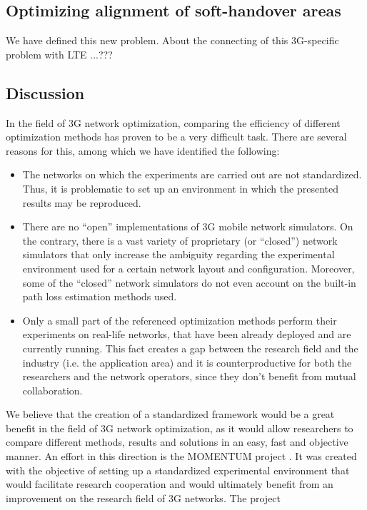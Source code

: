 \subsection{Optimizing alignment of soft-handover areas}

We have defined this new problem. About the connecting of this 3G-specific
problem with LTE ...???


\subsection{Discussion}

In the field of 3G network optimization, comparing the efficiency
of different optimization methods has proven to be a very difficult
task. There are several reasons for this, among which we have identified
the following:
\begin{itemize}
\item The networks on which the experiments are carried out are not standardized.
Thus, it is problematic to set up an environment in which the presented
results may be reproduced.
\item There are no ``open'' implementations of 3G mobile network simulators.
On the contrary, there is a vast variety of proprietary (or ``closed'')
network simulators that only increase the ambiguity regarding the
experimental environment used for a certain network layout and configuration.
Moreover, some of the ``closed'' network simulators do not even
account on the built-in path loss estimation methods used.
\item Only a small part of the referenced optimization methods perform their
experiments on real-life networks, that have been already deployed
and are currently running. This fact creates a gap between the research
field and the industry (i.e. the application area) and it is counterproductive
for both the researchers and the network operators, since they don't
benefit from mutual collaboration.
\end{itemize}
We believe that the creation of a standardized framework would be
a great benefit in the field of 3G network optimization, as it would
allow researchers to compare different methods, results and solutions
in an easy, fast and objective manner. An effort in this direction
is the MOMENTUM project \cite{Momentum.project}. It was created with
the objective of setting up a standardized experimental environment
that would facilitate research cooperation and would ultimately benefit
from an improvement on the research field of 3G networks. The project
